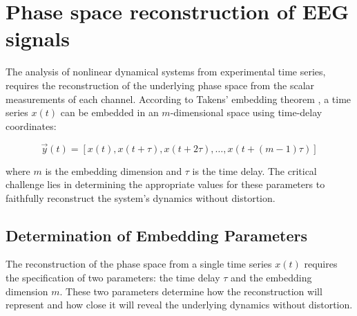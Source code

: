\documentclass{article}
\begin{document}

	\newpage

		\section{Phase space reconstruction of EEG signals}

			The analysis of nonlinear dynamical systems from experimental time series, requires 
			the reconstruction of the underlying phase space from the scalar measurements of each channel. 
			According to Takens' embedding theorem \cite{takens1981}, a time series $x(t)$ can be embedded 
			in an $m$-dimensional space using time-delay coordinates:

			\begin{equation}
			\vec{y}(t) = \left[x(t), x(t+\tau), x(t+2\tau), \ldots, x(t+(m-1)\tau)\right]
			\end{equation}

			where $m$ is the embedding dimension and $\tau$ is the time delay. The critical challenge lies in determining the appropriate values for these parameters to faithfully reconstruct the system's dynamics without distortion.


	

		\subsection{Determination of Embedding Parameters}
		The reconstruction of the phase space from a single time series 
		\( x(t) \) requires the specification of two parameters: 
		the time delay \( \tau \) and the embedding dimension \( m \). 
		These two parameters determine how the reconstruction will represent
		and how close it will reveal the underlying dynamics without distortion.
\end{document}
